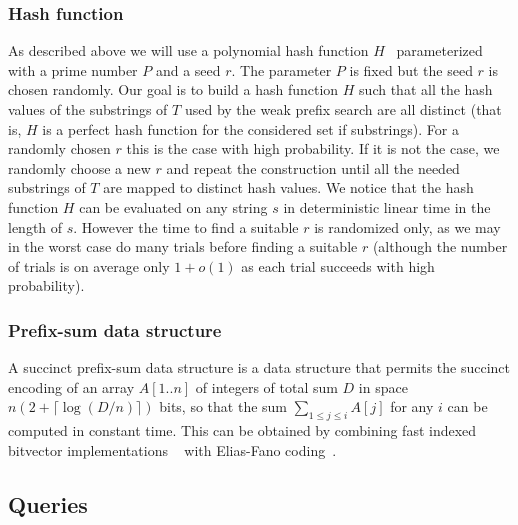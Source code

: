 \documentclass{article}
\newcommand{\?}{\mskip1.5mu}
\begin{document}
\subsubsection{Hash function}
As described above we will use a polynomial hash function $H$~\cite{KR87} parameterized with a prime number $P$ and a seed $r$. The parameter $P$ is fixed but the seed $r$ is chosen randomly. Our goal is to build a hash function $H$ such that all the hash values of the substrings of $T$ used by the weak prefix search are all distinct (that is, $H$ is a perfect hash function for the considered set if substrings). For a randomly chosen $r$ this is the case with high probability. If it is not the case, we randomly choose a new $r$ and repeat the construction until all the needed substrings of $T$ are mapped to distinct hash values. 
We notice that the hash function $H$ can be evaluated on any string $s$ in deterministic linear time in the length of $s$. However the time to find a suitable $r$ is randomized only, as we may in the worst case do many trials before finding a suitable $r$ (although the number of trials is on average only $1+o(1)$ as each trial succeeds with high probability). 

\subsubsection{Prefix-sum data structure}
A succinct prefix-sum data structure is a data structure that permits the succinct encoding of an array $A[1..n]$ of integers of total sum $D$ in space $n(2+\lceil\log(D/n)\rceil)$ bits, so that the sum $\sum_{1\leq j\leq i}A[j]$ for any $i$ can be computed in constant time. This can be obtained by combining fast indexed bitvector implementations ~\cite{J89,Mu96,CM96} with Elias-Fano coding~\cite{EliESRCASF,FanNBRISM}. 
\subsection{Queries}
\label{section:const_fix_query}
\end{document}
